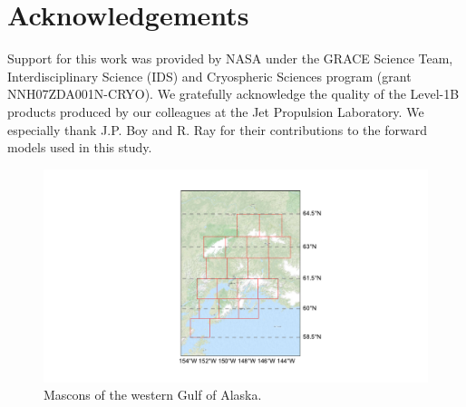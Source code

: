 \documentclass[review,oneside]{igs}
\begin{document}
\section{Acknowledgements}

Support for this work was provided by NASA under the GRACE Science Team, Interdisciplinary Science (IDS) and Cryospheric Sciences program (grant NNH07ZDA001N-CRYO). We gratefully acknowledge the quality of the Level-1B products produced by our colleagues at the Jet Propulsion Laboratory. We especially thank J.P. Boy and R. Ray for their contributions to the forward models used in this study. 


%


\begin{figure}
\noindent\includegraphics[width=178mm]{figures/westernMap} \centering \caption{Mascons of the western Gulf of Alaska.} \label{fig:wGOA_map}
\end{figure}

\end{document}
